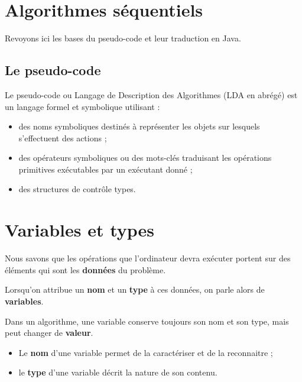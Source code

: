 \documentclass[11pt,a4paper]{article}
\begin{document}
            \section{Algorithmes s\'equentiels}Revoyons ici les bases du pseudo-code et leur traduction en Java.\subsection{Le pseudo-code}
		    Le pseudo-code ou Langage de Description des Algorithmes (LDA en abr\'eg\'e) est un langage
        formel et symbolique utilisant :
        
					\begin{itemize}
				
			\item 
            des noms symboliques destin\'es \`a repr\'esenter les objets sur lesquels s'effectuent des
            actions ;
          
			\item 
            des op\'erateurs symboliques ou des mots-cl\'es traduisant les op\'erations primitives
            ex\'ecutables par un ex\'ecutant donn\'e ;
          
			\item 
            des structures de contr\^ole types.
          
					\end{itemize}
				
            \par
        \section{Variables et types}
				Nous savons que les op\'erations que l'ordinateur devra ex\'ecuter portent sur des \'el\'ements qui
        sont les \textbf{donn\'ees} du probl\`eme.
      
            \par
        
        Lorsqu'on attribue un \textbf{nom} 
        et un \textbf{type} \`a ces donn\'ees, on
        parle alors de \textbf{variables}. 
      
            \par
        
        Dans un algorithme, une variable conserve toujours son nom et
        son type, mais peut changer de \textbf{valeur}.
         
					\begin{itemize}
				
			\item 
            Le \textbf{nom} d'une variable permet de la caract\'eriser et de la reconnaitre ;
          
			\item 
            le \textbf{type} d'une variable d\'ecrit la nature de son contenu.
          
					\end{itemize}
				
\end{document}
